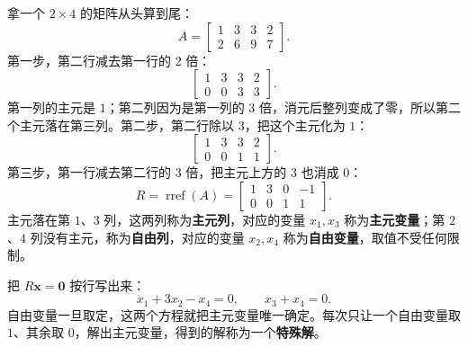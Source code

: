 \documentclass[UTF8,a4paper,12pt]{ctexart}
\numberwithin{equation}{section}
\begin{document}
	拿一个 $2\times4$ 的矩阵从头算到尾：
	\begin{equation}\label{eq:5.19}
	A=\begin{bmatrix}1&3&3&2\\2&6&9&7\end{bmatrix}.
	\end{equation}
	第一步，第二行减去第一行的 $2$ 倍：
	\begin{equation}\label{eq:5.20}
	\begin{bmatrix}1&3&3&2\\0&0&3&3\end{bmatrix}.
	\end{equation}
	第一列的主元是 $1$；第二列因为是第一列的 $3$ 倍，消元后整列变成了零，所以第二个主元落在第三列。第二步，第二行除以 $3$，把这个主元化为 $1$：
	\begin{equation}\label{eq:5.21}
	\begin{bmatrix}1&3&3&2\\0&0&1&1\end{bmatrix}.
	\end{equation}
	第三步，第一行减去第二行的 $3$ 倍，把主元上方的 $3$ 也消成 $0$：
	\begin{equation}\label{eq:5.22}
	R=\operatorname{rref}(A)=\begin{bmatrix}1&3&0&-1\\0&0&1&1\end{bmatrix}.
	\end{equation}
	主元落在第 $1$、$3$ 列，这两列称为\textbf{主元列}，对应的变量 $x_1,x_3$ 称为\textbf{主元变量}；第 $2$、$4$ 列没有主元，称为\textbf{自由列}，对应的变量 $x_2,x_4$ 称为\textbf{自由变量}，取值不受任何限制。
	
	把 $R\bm{x}=\bm{0}$ 按行写出来：
	\begin{equation}\label{eq:5.23}
	x_1+3x_2-x_4=0,
	\qquad x_3+x_4=0.
	\end{equation}
	自由变量一旦取定，这两个方程就把主元变量唯一确定。每次只让一个自由变量取 $1$、其余取 $0$，解出主元变量，得到的解称为一个\textbf{特殊解}。
	
\end{document}
